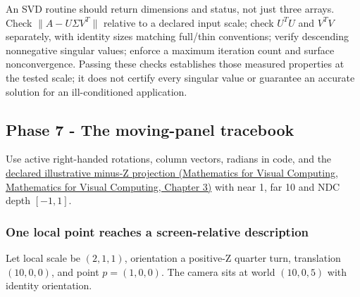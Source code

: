 An SVD routine should return dimensions and status, not just three arrays. Check \(\|A-U\Sigma V^T\|\) relative to a declared input scale; check \(U^TU\) and \(V^TV\) separately, with identity sizes matching full/thin conventions; verify descending nonnegative singular values; enforce a maximum iteration count and surface nonconvergence. Passing these checks establishes those measured properties at the tested scale; it does not certify every singular value or guarantee an accurate solution for an ill-conditioned application.

\subsection{Phase 7 - The moving-panel tracebook}\label{appendix-92ff77d4dfdc-phase-7---the-moving-panel-tracebook}

Use active right-handed rotations, column vectors, radians in code, and the \href{../02-Mathematics-for-Visual-Computing/main.pdf\#nameddest=01-foundations-i-ch019-figure-m6---follow-one-point-through-named-spaces}{declared illustrative minus-Z projection (Mathematics for Visual Computing, Mathematics for Visual Computing, Chapter 3)} with near 1, far 10 and NDC depth \([-1,1]\).

\subsubsection{One local point reaches a screen-relative description}\label{appendix-92ff77d4dfdc-one-local-point-reaches-a-screen-relative-description}

Let local scale be \((2,1,1)\), orientation a positive-Z quarter turn, translation \((10,0,0)\), and point \(p=(1,0,0)\). The camera sits at world \((10,0,5)\) with identity orientation.

